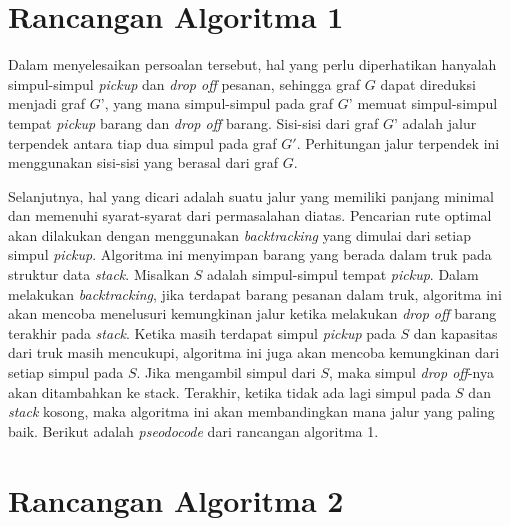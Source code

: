 \section{Rancangan Algoritma 1}

Dalam menyelesaikan persoalan tersebut, hal yang perlu diperhatikan hanyalah simpul-simpul \textit{pickup} dan \textit{drop off} pesanan, sehingga graf $G$ 
dapat direduksi menjadi graf $G’$, yang mana simpul-simpul pada graf $G’$ memuat simpul-simpul tempat \textit{pickup} barang dan \textit{drop off} barang.
Sisi-sisi dari graf $G’$ adalah jalur terpendek antara tiap dua simpul pada graf $G'$. 
Perhitungan jalur terpendek ini menggunakan sisi-sisi yang berasal dari graf $G$.

Selanjutnya, hal yang dicari adalah suatu jalur yang memiliki panjang minimal dan memenuhi syarat-syarat dari permasalahan diatas.
Pencarian rute optimal akan dilakukan dengan menggunakan \textit{backtracking} yang dimulai dari setiap simpul \textit{pickup}. 
Algoritma ini menyimpan barang yang berada dalam truk pada struktur data \textit{stack}. Misalkan $S$ adalah simpul-simpul tempat \textit{pickup}.
Dalam melakukan \textit{backtracking}, jika terdapat barang pesanan dalam truk, algoritma ini akan mencoba menelusuri 
kemungkinan jalur ketika melakukan \textit{drop off} barang terakhir pada \textit{stack}. Ketika masih terdapat simpul 
\textit{pickup} pada $S$ dan kapasitas dari truk masih mencukupi,
algoritma ini juga akan mencoba kemungkinan dari setiap simpul pada $S$. Jika mengambil simpul dari $S$, 
maka simpul \textit{drop off}-nya akan ditambahkan ke stack. Terakhir, ketika tidak ada lagi simpul pada $S$ dan
\textit{stack} kosong, maka algoritma ini akan membandingkan mana jalur yang paling baik. Berikut adalah \textit{pseodocode} dari rancangan algoritma 1.

\medskip


\section{Rancangan Algoritma 2}
